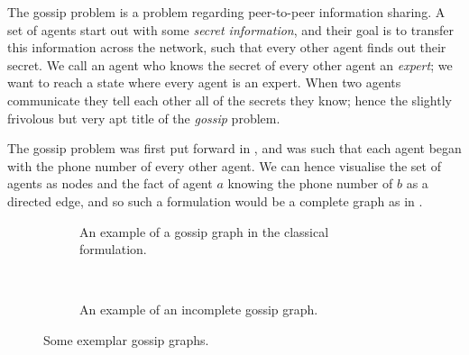 \documentclass[10pt, a4paper]{report}
\begin{document}
The gossip problem is a problem regarding peer-to-peer information sharing. A
set of agents start out with some \emph{secret information}, and their goal is
to transfer this information across the network, such that every other agent
finds out their secret. We call an agent who knows the secret of every other
agent an \emph{expert}; we want to reach a state where every agent is an
expert. When two agents communicate they tell each other all of the secrets they
know; hence the slightly frivolous but very apt title of the \emph{gossip}
problem.

The gossip problem was first put forward in \cite{Tijdeman:1971}, and was such
that each agent began with the phone number of every other agent. We can hence
visualise the set of agents as nodes and the fact of agent $a$ knowing the phone
number of $b$ as a directed edge, and so such a formulation would be a complete
graph as in .

\begin{figure}[h]
  \centering
  \begin{subfigure}[c]{0.4\textwidth}
    \centering
    \caption{An example of a gossip graph in the classical formulation.}
    \label{fig:classicgossipex}
  \end{subfigure}%
  ~
  \begin{subfigure}[c] {0.4\textwidth}
    \centering
    \caption{An example of an incomplete gossip graph. }
    \label{fig:dynamicgossipex}

  \end{subfigure}
  \caption{Some exemplar gossip graphs.}
\end{figure}
\end{document}
